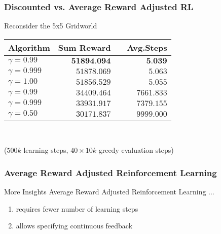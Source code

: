 \documentclass[xcolor=table%
,t]{beamer}
\begin{document}
\begin{frame}
  \frametitle{Discounted vs. Average Reward Adjusted RL}
  \begin{block}{Reconsider the 5x5 Gridworld~\footnotemark}
    \centering
    \begin{tabular}{@{}lrcr@{}}
      \toprule
      Algorithm & \multicolumn{1}{c}{Sum Reward}  & &\multicolumn{1}{c}{Avg.\@ Steps}\\
      \midrule
      \ARA{} \(\gamma=0.99\)  & \cellcolor{gr}\(\textbf{51894.094}\) & & \(\textbf{5.039}\)\\
      \ARA{} \(\gamma=0.999\) & \cellcolor{gr}\(51878.069\)          & & \cellcolor{gr}\(5.063\)\\
      \ARA{} \(\gamma=1.00\)  & \cellcolor{gr}\(51856.529\)          & & \cellcolor{gr}\(5.055\)\\
      \hhline{|~|-|~|-|}
      \QL{}  \(\gamma=0.99\)  & \cellcolor{gr2}\(34409.464\)         & & \cellcolor{gr2}\(7661.833\)  \\
      \QL{}  \(\gamma=0.999\) & \cellcolor{gr2}\(33931.917\)         & & \cellcolor{gr2}\(7379.155\) \\
      \QL{}  \(\gamma=0.50\)  & \(30171.837\)                        & &  \(9999.000\)\\
      \bottomrule
    \end{tabular}\\[0.5em]
    \begin{minipage}{\textwidth}
      \centering
      {\footnotesize (\(500k\) learning steps, \(40 \times 10k\) greedy evaluation steps)}

    \end{minipage}

  \end{block}
\end{frame}


\begin{frame}[t]
  \frametitle{Average Reward Adjusted Reinforcement Learning}

  \begin{block}{More Insights} Average Reward Adjusted Reinforcement Learning \(\ldots\)
    \begin{enumerate}
    \item requires fewer number of learning steps
    \item allows specifying continuous feedback
    \end{enumerate}
  \end{block}
\end{frame}
\end{document}
